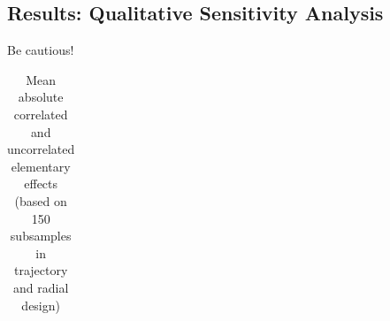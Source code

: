 \documentclass[a4paper,12pt]{article}
\begin{document}
\newpage
\subsection{Results: Qualitative Sensitivity Analysis}
Be cautious!
\newpage
\setlength{\tabcolsep}{22pt} %
\begin{table}[H] 
	\centering
	\begin{threeparttable}
		\caption[Model Parametrization]{Mean absolute correlated and uncorrelated elementary effects\\ (based on 150 subsamples in trajectory and radial design)}
		\label{tab:params}
		\renewcommand{\arraystretch}{1.2}%
		\begin{tabular}{cS[table-format=3.2]S[table-format=3.2]@{\hskip 0.7in}|@{\hskip 0.5in}S[table-format=3.2]S[table-format=3.2]}


\end{tabular}
\end{threeparttable}
\end{table}
\end{document}
